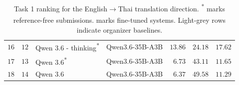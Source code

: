 \begin{table}[t]
\begin{tabular}{rrllrrr}
\rowcolor{black!15} $16$ & $12$ & Qwen 3.6 - thinking\textsuperscript{*} & Qwen3.6-35B-A3B & $13.86$ & $24.18$ & $17.62$ \\
\rowcolor{black!15} $17$ & $13$ & Qwen 3.6\textsuperscript{*} & Qwen3.6-35B-A3B & $6.73$ & $43.11$ & $11.65$ \\
\rowcolor{black!15} $18$ & $14$ & Qwen 3.6 & Qwen3.6-35B-A3B & $6.37$ & $49.58$ & $11.29$ \\
\bottomrule
\end{tabular}
\caption{Task 1 ranking for the English$\rightarrow$Thai translation direction. \textsuperscript{*} marks reference-free submissions. \textsuperscript{\textdagger} marks fine-tuned systems. Light-grey rows indicate organizer baselines.}
\label{tab:task1-eng-tha-results}
\end{table}


